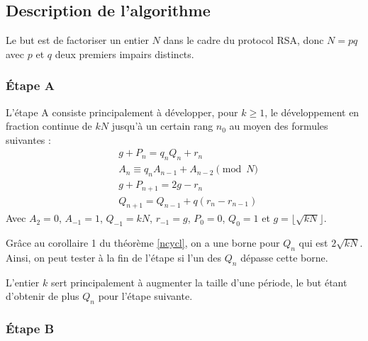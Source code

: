 \documentclass[a4paper]{article} %
\numberwithin{equation}{section}
\begin{document}
\subsection{Description de l'algorithme}

Le but est de factoriser un entier $N$ dans le cadre du protocol RSA, donc $N = pq$ avec $p$ et $q$ deux premiers impairs distincts.
\subsubsection{Étape A}

L'étape A consiste principalement à développer, pour $k\geq1$, le développement en fraction continue de $kN$ jusqu'à un certain rang $n_0$ au moyen des formules suivantes :
\begin{align}
&g + P_n = q_nQ_n + r_n\\
&A_n \equiv q_nA_{n-1} + A_{n-2} \pmod{N}\\
&g + P_{n+1} = 2g -r_n\\
&Q_{n+1} = Q_{n-1} + q(r_n - r_{n-1})
\end{align}
Avec $A_2 = 0$, $A_{-1} = 1$, $Q_{-1} = kN$, $r_{-1} = g$, $P_0 = 0$, $Q_0 = 1$ et $g = \lfloor\sqrt{kN}\rfloor$.\\
\begin{rem}
Grâce au corollaire 1 du théorème \ref{ncycl}, on a une borne pour $Q_n$ qui est $2\sqrt{kN}$. Ainsi, on peut tester à la fin de l'étape si l'un des $Q_n$ dépasse cette borne.\par
L'entier $k$ sert principalement à augmenter la taille d'une période, le but étant d'obtenir de plus $Q_n$ pour l'étape suivante.
\end{rem}
\subsubsection{Étape B}
\end{document}
